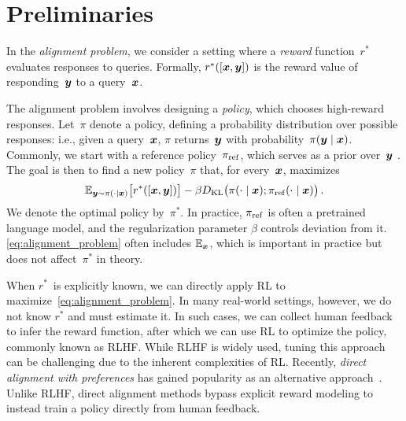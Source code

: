 \section{Preliminaries}
\label{sec:prelim}

In the \emph{alignment problem}, we consider a setting where a \emph{reward} function~$r^*$ evaluates responses to queries. Formally, $r^*([{\bm{x}}, {\bm{y}}])$ is the reward value of responding~${\bm{y}}$ to a query~${\bm{x}}$. 

The alignment problem involves designing a \emph{policy}, which chooses high-reward responses. Let~$\pi$ denote a policy, defining a probability distribution over possible responses: i.e., given a query~${\bm{x}}$, $\pi$ returns~${\bm{y}}$ with probability~$\pi({\bm{y}} \mid {\bm{x}})$. 
%
Commonly, we start with a reference policy~$\pi_{\rm ref}$, which serves as a prior over~${\bm{y}}$ \citep{korbak2022rl}. The goal is then to find a new policy~$\pi$ that, for every~${\bm{x}}$, maximizes 
%
\begin{equation}
\label{eq:alignment_problem}
    \mathbb{E}_{{\bm{y}} \sim \pi(\cdot \mid {\bm{x}})}\big[r^*([{\bm{x}}, {\bm{y}}])\big] - \beta D_{\mathrm{KL}}\big(\pi(\cdot \mid {\bm{x}}); \pi_{\rm ref}(\cdot \mid {\bm{x}})\big)
    \,.
\end{equation}
%
We denote the optimal policy by~$\pi^*$. In practice, $\pi_{\rm ref}$ is often a pretrained language model, and the regularization parameter 
$\beta$ controls deviation from it. 
\ifarxiv \cref{eq:alignment_problem} often includes $\mathbb{E}_{\bm{x}}$, which is important in practice but does not affect~$\pi^*$ in theory. \fi

When $r^*$~is explicitly known, we can directly apply RL to maximize~\cref{eq:alignment_problem}. In many real-world settings, however, we do not know $r^*$ and must estimate it. In such cases, we can collect human feedback to infer the reward function, after which we can use RL to optimize the policy, commonly known as RLHF. While RLHF is widely used, tuning this approach can be challenging due to the inherent complexities of RL. 
Recently, \emph{direct alignment with preferences} has gained popularity as an alternative approach~\citep{zhao2023slic,rafailov2024direct,olaif}. Unlike RLHF, direct alignment methods bypass explicit reward modeling to instead train a policy directly from human feedback. 


